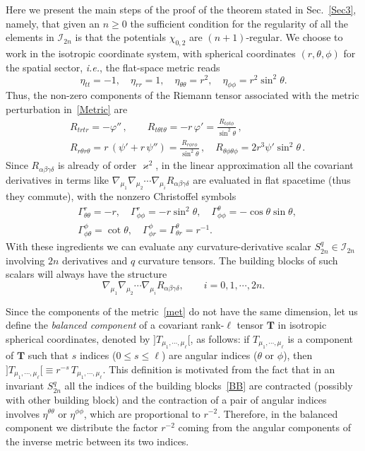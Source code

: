 \documentclass[aps,prd,a4paper,twocolumn,showpacs,showkeys,preprintnumbers,amsmath,amssymb,nofootinbib]{revtex4-2}
\numberwithin{equation}{section}
\def\beq{\begin{equation}}
\def\eeq{\end{equation}}
\def\al{\alpha}
\def\be{\beta}
\def\ga{\gamma}
\def\Ga{\Gamma}
\def\de{\delta}
\def\th{\theta}
\def\ph{\varphi}
\def\na{\nabla}
\begin{document}
Here we present the main steps of the proof of the theorem stated in Sec.~\ref{Sec3}, namely,
that given an $n\geqslant 0$ the sufficient condition for the regularity of all the elements in $\mathscr{I}_{2n}$ is that the potentials $\chi_{0,2}$ are $(n+1)$-regular. We choose to work in the isotropic coordinate system, with spherical coordinates $(r,\th,\phi)$ for the spatial sector, \textit{i.e.}, the flat-space metric reads
\beq \label{met}
\eta_{tt}=-1 , \quad \eta_{rr}=1, \quad \eta_{\th\th}=r^2 , \quad \eta_{\phi\phi}=r^2 \sin^2 \th .
\eeq
Thus, the non-zero components of the Riemann tensor associated with the metric perturbation in~\eqref{Metric} are
%
\begin{align} \label{Riem}
& R_{trtr} = -\ph'' 
\,, \qquad 
R_{t\th t\th} = - r \, \ph' = \frac{
{  R_{t\phi t\phi}   }
}{\sin^2 \theta}
\,,
\\
& R_{r\th r \th} = r \, (\psi ' + r \, \psi '' ) = \frac{
{  R_{r\phi r \phi}   }
}{\sin^2 \theta}
\,,
\quad 
R_{\th\phi\th\phi} =
2 r^3 \psi ' \sin^2 \theta  
\,.
\nonumber
\end{align}
Since $R_{\al\be\ga\de}$ is already of order $\varkappa^2$, in the linear approximation all the covariant derivatives in terms like $\na_{\mu_1} \na_{\mu_2} \cdots \na_{\mu_i} R_{\al\be\ga\de}$ are evaluated in flat spacetime (thus they commute), with the nonzero Christoffel symbols
%
\begin{equation} \label{Chris}
\begin{split}
&\Ga^r_{\th\th} = - r , \quad \Ga^r_{\phi\phi} = - r \sin^2 \th , \quad \Ga^\th_{\phi\phi} = - \cos\th \sin\th , 
\\
&\Ga^\phi_{\phi\th} = \cot\th , \quad \Ga^\phi_{\phi r} = \Ga^\th_{\th r} = r^{-1} .
\end{split}
\end{equation}
%
With these ingredients we can evaluate any curvature-derivative scalar $S_{2n}^q \in \mathscr{I}_{2n}$ involving $2n$ derivatives and $q$ curvature tensors. The building blocks of such scalars will always have the structure
%
\beq \label{BB}
\na_{\mu_1}\na_{\mu_2}\cdots\na_{\mu_i} R_{\al\be\ga\de} , \qquad i=0,1,\cdots, 2n.
\eeq


Since the components of the metric~\eqref{met} do not have the same dimension, let us define the \textit{balanced component} of a covariant rank-$\ell$ tensor $\mathbf{T}$ in isotropic spherical coordinates, denoted by $]T_{\mu_1,\cdots,\mu_\ell}[$, as follows: if  $T_{\mu_1,\cdots,\mu_\ell}$ is a component of $\mathbf{T}$ such that $s$ indices ($0 \leqslant s \leqslant \ell$) are angular indices ($\th$ or $\phi$), then ${]T_{\mu_1,\cdots,\mu_\ell}[} \equiv r^{-s} \, T_{\mu_1,\cdots,\mu_\ell}$. This definition is motivated from the fact that in an invariant $S_{2n}^q$ all the indices of the building blocks~\eqref{BB} are contracted (possibly with other building block) and the contraction of a pair of angular indices involves $\eta^{\th\th}$ or $\eta^{\phi\phi}$, which are proportional to $r^{-2}$. Therefore, in the balanced component we distribute the factor $r^{-2}$ coming from the angular components of the inverse metric between its two indices.
\end{document}
